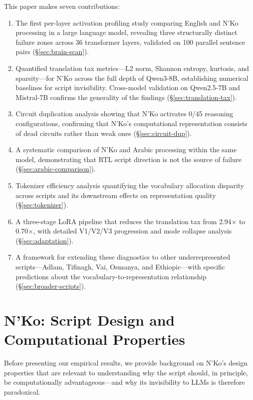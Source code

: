\documentclass[11pt]{article}
\begin{document}
This paper makes seven contributions:

\begin{enumerate}
\item The first per-layer activation profiling study comparing English and N'Ko processing in a large language model, revealing three structurally distinct failure zones across 36 transformer layers, validated on 100 parallel sentence pairs (\S\ref{sec:brain-scan}).
\item Quantified translation tax metrics---L2 norm, Shannon entropy, kurtosis, and sparsity---for N'Ko across the full depth of Qwen3-8B, establishing numerical baselines for script invisibility. Cross-model validation on Qwen2.5-7B and Mistral-7B confirms the generality of the findings (\S\ref{sec:translation-tax}).
\item Circuit duplication analysis showing that N'Ko activates 0/45 reasoning configurations, confirming that N'Ko's computational representation consists of dead circuits rather than weak ones (\S\ref{sec:circuit-dup}).
\item A systematic comparison of N'Ko and Arabic processing within the same model, demonstrating that RTL script direction is not the source of failure (\S\ref{sec:arabic-comparison}).
\item Tokenizer efficiency analysis quantifying the vocabulary allocation disparity across scripts and its downstream effects on representation quality (\S\ref{sec:tokenizer}).
\item A three-stage LoRA pipeline that reduces the translation tax from 2.94$\times$ to 0.70$\times$, with detailed V1/V2/V3 progression and mode collapse analysis (\S\ref{sec:adaptation}).
\item A framework for extending these diagnostics to other underrepresented scripts---Adlam, Tifinagh, Vai, Osmanya, and Ethiopic---with specific predictions about the vocabulary-to-representation relationship (\S\ref{sec:broader-scripts}).
\end{enumerate}

\section{N'Ko: Script Design and Computational Properties}

Before presenting our empirical results, we provide background on N'Ko's design properties that are relevant to understanding why the script should, in principle, be computationally advantageous---and why its invisibility to LLMs is therefore paradoxical.
\end{document}
